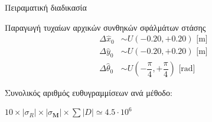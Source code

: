 \begin{frame}{Πειραματική διαδικασία}
{\begin{minipage}{\linewidth}
\begin{minipage}{0.56\linewidth}
\begin{bw_box}
      Παραγωγή τυχαίων αρχικών συνθηκών σφάλμάτων στάσης
      \begin{align}
        \Delta \hat{x}_0     &\sim U(-0.20,+0.20) \text{ [m]} \nonumber \\
        \Delta \hat{y}_0     &\sim U(-0.20,+0.20)  \text{ [m]}\nonumber \\
        \Delta\hat{\theta}_0 &\sim U(-\dfrac{\pi}{4}, +\dfrac{\pi}{4})  \text{ [rad]}\nonumber
      \end{align}


      \end{bw_box}


      \scriptsize
      \begin{center}
      Συνολικός αριθμός ευθυγραμμίσεων ανά μέθοδο:

      $10 \times |\sigma_R| \times |\sigma_{\bm{M}}| \times \sum |D| \simeq 4.5 \cdot 10^6$
      \end{center}
    \end{minipage}
  \end{minipage}
  }


\end{frame}
